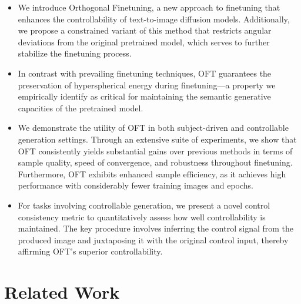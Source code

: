 \begin{itemize}[leftmargin=*,nosep]

    \item We introduce Orthogonal Finetuning, a new approach to finetuning that enhances the controllability of text-to-image diffusion models. Additionally, we propose a constrained variant of this method that restricts angular deviations from the original pretrained model, which serves to further stabilize the finetuning process.
    \item In contrast with prevailing finetuning techniques, OFT guarantees the preservation of hyperspherical energy during finetuning—a property we empirically identify as critical for maintaining the semantic generative capacities of the pretrained model.
    \item We demonstrate the utility of OFT in both subject-driven and controllable generation settings. Through an extensive suite of experiments, we show that OFT consistently yields substantial gains over previous methods in terms of sample quality, speed of convergence, and robustness throughout finetuning. Furthermore, OFT exhibits enhanced sample efficiency, as it achieves high performance with considerably fewer training images and epochs.
    \item For tasks involving controllable generation, we present a novel control consistency metric to quantitatively assess how well controllability is maintained. The key procedure involves inferring the control signal from the produced image and juxtaposing it with the original control input, thereby affirming OFT’s superior controllability.
\end{itemize}

\section{Related Work}

